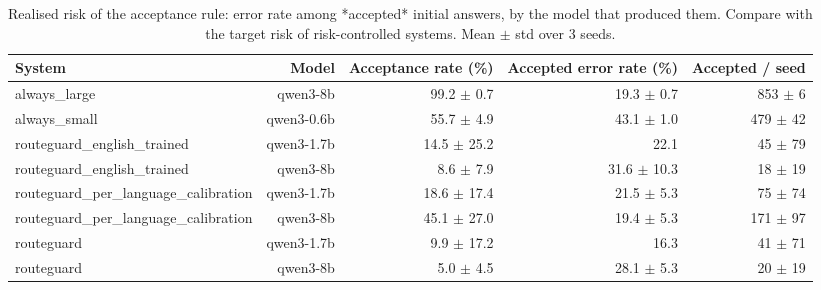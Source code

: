 \begin{table}[t]
\centering
\small
\caption{Realised risk of the acceptance rule: error rate among *accepted* initial answers, by the model that produced them. Compare with the target risk of risk-controlled systems. Mean $\pm$ std over 3 seeds.}
\label{tab:acceptance}
\begin{tabular}{lrrrr}
\toprule
System & Model & Acceptance rate (\%) & Accepted error rate (\%) & Accepted / seed \\
\midrule
always\_large & qwen3-8b & 99.2 $\pm$ 0.7 & 19.3 $\pm$ 0.7 & 853 $\pm$ 6 \\
always\_small & qwen3-0.6b & 55.7 $\pm$ 4.9 & 43.1 $\pm$ 1.0 & 479 $\pm$ 42 \\
routeguard\_english\_trained & qwen3-1.7b & 14.5 $\pm$ 25.2 & 22.1 & 45 $\pm$ 79 \\
routeguard\_english\_trained & qwen3-8b & 8.6 $\pm$ 7.9 & 31.6 $\pm$ 10.3 & 18 $\pm$ 19 \\
routeguard\_per\_language\_calibration & qwen3-1.7b & 18.6 $\pm$ 17.4 & 21.5 $\pm$ 5.3 & 75 $\pm$ 74 \\
routeguard\_per\_language\_calibration & qwen3-8b & 45.1 $\pm$ 27.0 & 19.4 $\pm$ 5.3 & 171 $\pm$ 97 \\
routeguard & qwen3-1.7b & 9.9 $\pm$ 17.2 & 16.3 & 41 $\pm$ 71 \\
routeguard & qwen3-8b & 5.0 $\pm$ 4.5 & 28.1 $\pm$ 5.3 & 20 $\pm$ 19 \\
\bottomrule
\end{tabular}
\end{table}
